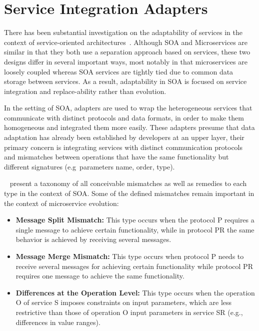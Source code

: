 \section{Service Integration Adapters} %
\label{sec:service_integration_adapters}

There has been substantial investigation on the adaptability of services in the context of service-oriented architectures~\cite{adaptersWebServices}.
Although SOA and Microservices are similar in that they both use a separation approach based on services,
these two designs differ in several important ways, most notably in that microservices are loosely coupled whereas SOA services are tightly tied due to common data storage between services.
As a result, adaptability in SOA is focused on service integration and replace-ability rather than evolution.

In the setting of SOA, adapters are used to wrap the heterogeneous services that communicate with distinct protocols and data formats,
in order to make them homogeneous and integrated them more easily.
These adapters presume that data adaptation has already been established by developers at an upper layer,
their primary concern is integrating services with distinct communication protocols and mismatches between operations that have the
same functionality but different signatures (e.g\ parameters name, order, type).

\citeauthor{adaptersWebServices}~\cite{adaptersWebServices} present a taxonomy of all conceivable mismatches as well as remedies to each type in the context of SOA.
Some of the defined mismatches remain important in the context of microservice evolution:

\begin{itemize}
    \item \textbf{Message Split Mismatch:} This type occurs when the protocol P requires a single message to achieve certain functionality,
    while in protocol PR the same behavior is achieved by receiving several messages.
    \item \textbf{Message Merge Mismatch:} This type occurs when protocol P needs to receive several messages for achieving certain
    functionality while protocol PR requires one message to achieve the same functionality.
    \item \textbf{Differences at the Operation Level:} This type occurs when the operation O of service S imposes constraints on input parameters,
    which are less restrictive than those of operation O input parameters in service SR (e.g., differences in value ranges).
\end{itemize}

